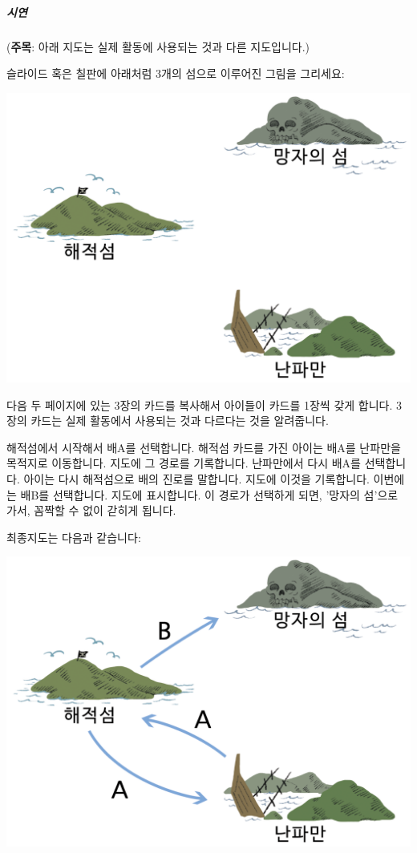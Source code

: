\documentclass[]{article}
\begin{document}
\subparagraph{시연}\label{section-161}

(\textbf{주목}: 아래 지도는 실제 활동에 사용되는 것과 다른 지도입니다.)

슬라이드 혹은 칠판에 아래처럼 3개의 섬으로 이루어진 그림을 그리세요:

\includegraphics{csunplugged/03-part/img/ch12-fsm/11-fsm-01-three-islands.png}

다음 두 페이지에 있는 3장의 카드를 복사해서 아이들이 카드를 1장씩 갖게
합니다. 3장의 카드는 실제 활동에서 사용되는 것과 다르다는 것을
알려줍니다.

해적섬에서 시작해서 배A를 선택합니다. 해적섬 카드를 가진 아이는 배A를
난파만을 목적지로 이동합니다. 지도에 그 경로를 기록합니다. 난파만에서
다시 배A를 선택합니다. 아이는 다시 해적섬으로 배의 진로를 말합니다.
지도에 이것을 기록합니다. 이번에는 배B를 선택합니다. 지도에 표시합니다.
이 경로가 선택하게 되면, '망자의 섬'으로 가서, 꼼짝할 수 없이 갇히게
됩니다.

최종지도는 다음과 같습니다:

\includegraphics{csunplugged/03-part/img/ch12-fsm/11-fsm-01-three-islands-demo.png}
\end{document}
